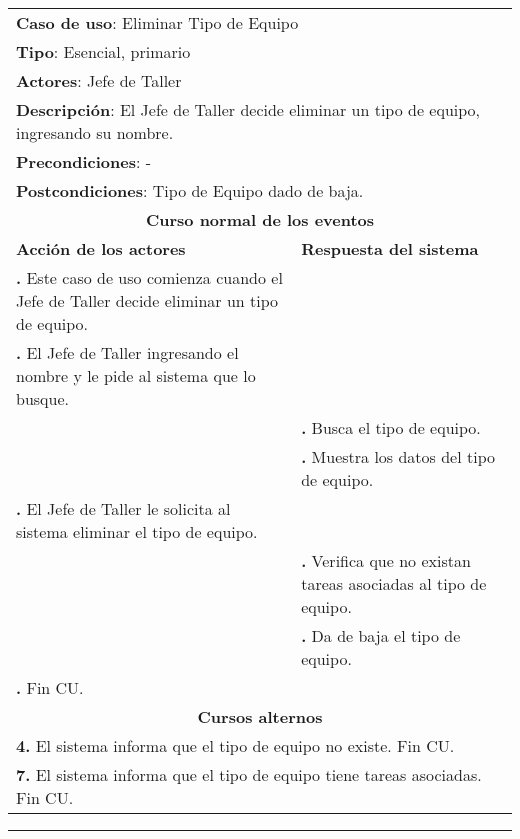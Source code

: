 \documentclass[12pt]{extarticle}
\begin{document}


    \newcommand\inc{\stepcounter{step}\textbf{\thestep. }}
    \newcommand\resetinc{\setcounter{step}{0}}

    \newcommand\raya{\noindent\rule{169mm}{0.8mm}\\}

	\begin{longtable}{ |p{8cm}|p{8cm}| }
		\hline
		\multicolumn{2}{|p{16cm}|}{\textbf{Caso de uso}: Eliminar Tipo de Equipo}\\
		\multicolumn{2}{|p{16cm}|}{\textbf{Tipo}: Esencial, primario}\\
		\multicolumn{2}{|p{16cm}|}{\textbf{Actores}: Jefe de Taller}\\
		\multicolumn{2}{|p{16cm}|}{\textbf{Descripción}: El Jefe de Taller decide eliminar un tipo de equipo, ingresando su nombre.}\\
		\multicolumn{2}{|p{16cm}|}{\textbf{Precondiciones}: -}\\
		\multicolumn{2}{|p{16cm}|}{\textbf{Postcondiciones}: Tipo de Equipo dado de baja.}\\
		\hline
		\multicolumn{2}{|c|}{\textbf{Curso normal de los eventos}}\\
		\hline
		\textbf{Acción de los actores} & \textbf{Respuesta del sistema}\\
		\hline
			\inc Este caso de uso comienza cuando el Jefe de Taller decide eliminar un tipo de equipo. & \\
			\hline
			\inc El Jefe de Taller ingresando el nombre y le pide al sistema que lo busque. & \\
			\hline
			& \inc Busca el tipo de equipo.\\
			\hline
			& \inc Muestra los datos del tipo de equipo. \\
			\hline
			\inc El Jefe de Taller le solicita al sistema eliminar el tipo de equipo.&\\
			\hline
			& \inc Verifica que no existan tareas asociadas al tipo de equipo.\\
			\hline
      & \inc Da de baja el tipo de equipo.\\
			\hline
			\inc Fin CU. & \\
		\hline
		\multicolumn{2}{|c|}{\textbf{Cursos alternos}}\\
		\hline
		\multicolumn{2}{|p{16cm}|}{\textbf{4. }El sistema informa que el tipo de equipo no existe. Fin CU.}\\
		\hline
		\multicolumn{2}{|p{16cm}|}{\textbf{7. }El sistema informa que el tipo de equipo tiene tareas asociadas. Fin CU.}\\
		\hline
	\end{longtable}

    \setcounter{step}{0}

    \noindent\rule{169mm}{0.8mm}\\
\end{document}
